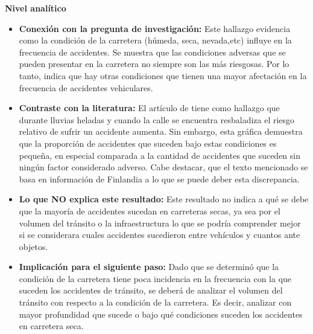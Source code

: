 \documentclass[12pt]{article}
\begin{document}
\textbf{Nivel analítico}
\begin{itemize}
    \item \textbf{Conexión con la pregunta de investigación:} Este hallazgo evidencia 
    como la condición de la carretera (húmeda, seca, nevada,etc) influye en la 
    frecuencia de accidentes. Se muestra que las condiciones adversas que se pueden 
    presentar en la carretera no siempre son las más riesgosas. Por lo tanto, 
    indica que hay otras condiciones que tienen una mayor afectación en la frecuencia 
    de accidentes vehiculares. \\

    \item \textbf{Contraste con la literatura:} El artículo de \textcite{MALIN2019} 
    tiene como hallazgo que durante lluvias heladas y cuando la calle se encuentra
    resbaladiza el riesgo relativo de sufrir un accidente aumenta. Sin embargo, 
    esta gráfica demuestra que la proporción de accidentes que suceden bajo estas 
    condiciones es pequeña, en especial comparada a la cantidad de accidentes que 
    suceden sin ningún factor considerado adverso. Cabe destacar, que el texto 
    mencionado se basa en información de Finlandia a lo que se puede deber esta 
    discrepancia. \\

    \item \textbf{Lo que NO explica este resultado:} Este resultado no indica a 
    qué se debe que la mayoría de accidentes sucedan en carreteras secas, ya sea 
    por el volumen del tránsito o la infraestructura lo que se podría comprender 
    mejor si se considerara cuales accidentes sucedieron entre vehículos y cuantos 
    ante objetos.\\ 

    \item \textbf{Implicación para el siguiente paso:}  Dado que se determinó que 
    la condición de la carretera tiene poca incidencia en la frecuencia con la 
    que suceden los accidentes de tránsito, se deberá de analizar el volumen del 
    tránsito con respecto a la condición de la carretera. Es decir, analizar con 
    mayor profundidad que sucede o bajo qué condiciones suceden los accidentes en 
    carretera seca.  \\
\end{itemize}
\end{document}
